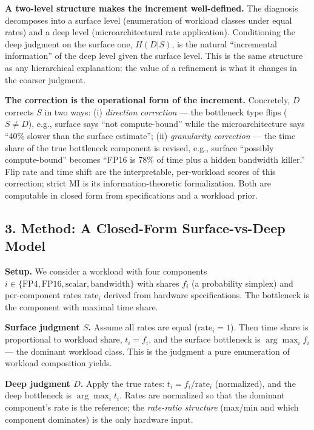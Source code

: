\textbf{A two-level structure makes the increment well-defined.} The diagnosis decomposes into a surface level (enumeration of workload classes under equal rates) and a deep level (microarchitectural rate application). Conditioning the deep judgment on the surface one, \(H(D|S)\), is the natural ``incremental information'' of the deep level given the surface level. This is the same structure as any hierarchical explanation: the value of a refinement is what it changes in the coarser judgment.

\textbf{The correction is the operational form of the increment.} Concretely, \(D\) corrects \(S\) in two ways: (i) \emph{direction correction} --- the bottleneck type flips (\(S \neq D\)), e.g., surface says ``not compute-bound'' while the microarchitecture says ``40\% slower than the surface estimate''; (ii) \emph{granularity correction} --- the time share of the true bottleneck component is revised, e.g., surface ``possibly compute-bound'' becomes ``FP16 is 78\% of time plus a hidden bandwidth killer.'' Flip rate and time shift are the interpretable, per-workload scores of this correction; strict MI is its information-theoretic formalization. Both are computable in closed form from specifications and a workload prior.

\subsection{3. Method: A Closed-Form Surface-vs-Deep Model}\label{method-a-closed-form-surface-vs-deep-model}

\textbf{Setup.} We consider a workload with four components \(i \in \{\text{FP4}, \text{FP16}, \text{scalar}, \text{bandwidth}\}\) with shares \(f_i\) (a probability simplex) and per-component rates \(\text{rate}_i\) derived from hardware specifications. The bottleneck is the component with maximal time share.

\textbf{Surface judgment \(S\).} Assume all rates are equal (\(\text{rate}_i = 1\)). Then time share is proportional to workload share, \(t_i = f_i\), and the surface bottleneck is \(\arg\max_i f_i\) --- the dominant workload class. This is the judgment a pure enumeration of workload composition yields.

\textbf{Deep judgment \(D\).} Apply the true rates: \(t_i = f_i / \text{rate}_i\) (normalized), and the deep bottleneck is \(\arg\max_i t_i\). Rates are normalized so that the dominant component's rate is the reference; the \emph{rate-ratio structure} (max/min and which component dominates) is the only hardware input.

